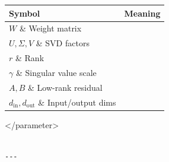 \begin{table}[H]
\centering
\small
\begin{tabular}{ll}
\toprule
\textbf{Symbol} & \textbf{Meaning} \\
\midrule
$W$ \& Weight matrix \\
$U, \Sigma, V$ \& SVD factors \\
$r$ \& Rank \\
$\gamma$ \& Singular value scale \\
$A, B$ \& Low-rank residual \\
$d_\text{in}, d_\text{out}$ \& Input/output dims \\
\bottomrule
\end{tabular}
\end{table}
</parameter>
\begin{lstlisting}

---
\end{lstlisting}